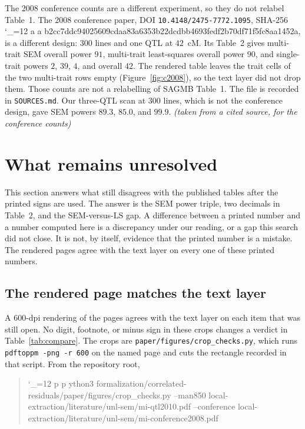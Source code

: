 \documentclass[11pt]{article}
\makeatletter
\newcommand{\sha}{\begingroup\catcode`\_=12 \sha@read}
\newcommand{\sha@read}[1]{\ttfamily\sha@loop#1\relax\endgroup}
\def\sha@loop#1{%
  \ifx\relax#1\else
    #1\allowbreak
    \expandafter\sha@loop
  \fi}
\newcommand{\ev}[1]{\textup{\emph{(#1)}}}
\makeatother
\begin{document}
The 2008 conference counts are a different experiment, so they do not
relabel Table~1. The 2008 conference paper, DOI \texttt{10.4148/2475-7772.1095}, SHA-256
\sha{ab2cc7ddc94025609cdaa83a6353b22dcdbb4693fedf2b70df71f5fc8aa1452a},
is a different design: $300$ lines and one QTL at $42$~cM. Its Table~2
gives multi-trait SEM overall power $91$, multi-trait least-squares
overall power $90$, and single-trait powers $2$, $39$, $4$, and overall
$42$. The rendered table leaves the trait cells of the two multi-trait
rows empty (Figure~\ref{fig:c2008}), so the text layer did not drop them.
Those counts are not a relabelling of SAGMB Table~1. The file is
recorded in \texttt{SOURCES.md}. Our three-QTL scan at $300$ lines, which is
not the conference design, gave SEM powers $89.3$, $85.0$, and $99.9$.
\ev{taken from a cited source, for the conference counts}

\section{What remains unresolved}
\label{sec:open}

This section answers what still disagrees with the published tables after
the printed signs are used. The answer is the SEM power triple, two
decimals in Table~2, and the SEM-versus-LS gap. A difference between a
printed number and a number computed here is a discrepancy under our reading,
or a gap this search did not close. It is not, by itself, evidence that the
printed number is a mistake. The rendered pages agree with the text layer
on every one of these printed numbers.

\subsection{The rendered page matches the text layer}
\label{sec:ink}

A 600-dpi rendering of the pages agrees with the text layer on each item
that was still open. No digit, footnote, or minus sign in these crops
changes a verdict in Table~\ref{tab:compare}. The crops are
\texttt{paper/figures/crop\_checks.py}, which runs
\texttt{pdftoppm -png -r 600} on the named page and cuts the rectangle
recorded in that script. From the repository root,
\begin{quote}\noindent
\sha{python3 formalization/correlated-residuals/paper/figures/crop_checks.py --man850 local-extraction/literature/unl-sem/mi-qtl2010.pdf --conference local-extraction/literature/unl-sem/mi-conference2008.pdf}
\end{quote}
\end{document}
